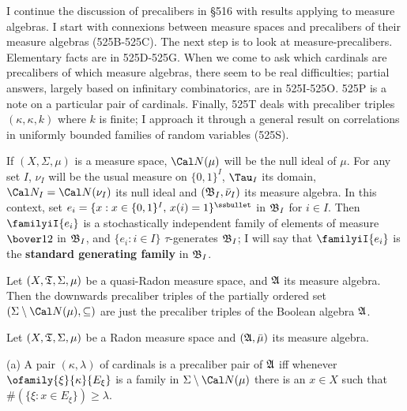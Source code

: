 
\def\chaptername{Cardinal functions of measure theory}
\def\sectionname{Precalibers}


I continue the discussion of precalibers in \S516 with results applying
to measure algebras.   I start with connexions between measure spaces
and precalibers of their measure algebras (525B-525C). %
The next step is to look at measure-precalibers.   Elementary facts are
in 525D-525G. %
When we come to ask which cardinals are precalibers of which measure
algebras, there seem to be real difficulties;  partial answers, largely
based on infinitary combinatorics, are in
525I-525O.  %
525P is a note on a particular pair of cardinals.   Finally, 525T deals
with precaliber triples $(\kappa,\kappa,k)$ where
$k$ is finite;  I approach it through a general result on correlations
in uniformly bounded families of random variables (525S).

 If $(X,\Sigma,\mu)$ is a measure space,
$\Cal N(\mu)$ will be the null ideal of $\mu$.   For any set
$I$, $\nu_I$ will be the usual measure on $\{0,1\}^I$, $\Tau_I$ its
domain, $\Cal N_I=\Cal N(\nu_I)$ its null ideal and
$(\frak B_I,\bar\nu_I)$ its measure algebra.
In this context, set $e_i=\{x:x\in\{0,1\}^I,\,x(i)=1\}^{\ssbullet}$
in $\frak B_I$ for $i\in I$.
Then $\familyiI{e_i}$ is a stochastically independent
family of elements of measure $\bover12$ in $\frak B_I$, and
$\{e_i:i\in I\}\,\,\tau$-generates $\frak B_I$;  I will say that
$\familyiI{e_i}$ is the {\bf standard generating family} in $\frak B_I$.

 Let $(X,\frak T,\Sigma,\mu)$ be a quasi-Radon
measure space, and $\frak A$ its measure algebra.   Then the downwards
precaliber triples of the partially
ordered set $(\Sigma\setminus\Cal N(\mu),\subseteq)$ are just the
precaliber triples of the Boolean algebra $\frak A$.


 Let $(X,\frak T,\Sigma,\mu)$ be a Radon measure
space and $(\frak A,\bar\mu)$ its measure algebra.

(a) A pair $(\kappa,\lambda)$ of cardinals is a precaliber pair of
$\frak A$ iff whenever $\ofamily{\xi}{\kappa}{E_{\xi}}$ is a family in
$\Sigma\setminus\Cal N(\mu)$ there is an $x\in X$ such that
$\#(\{\xi:x\in E_{\xi}\})\ge\lambda$.

